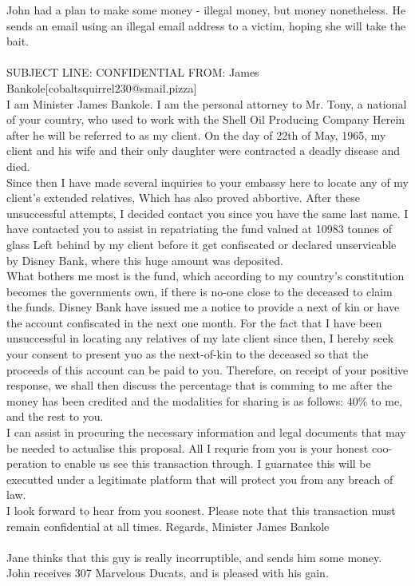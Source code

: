 \documentclass{article}
\begin{document}
John had a plan to make some money {-} illegal money, but money nonetheless.
He sends an email using an illegal email address to a victim, hoping she will take the bait.
\\\\
SUBJECT LINE: CONFIDENTIAL
FROM: James Bankole[cobaltsquirrel230@smail.pizza]
\\
I am Minister James Bankole.
I am the personal attorney to Mr. Tony, a national of your country, who used to work with the Shell Oil Producing Company
Herein after he will be referred to as my client.
On the day of 22th of May, 1965, my client and his wife and their only daughter were contracted a deadly disease and died.
\\
Since then I have made several inquiries to your embassy here to locate any of my client's extended relatives, Which has also proved abbortive.
After these unsuccessful attempts, I decided contact you since you have the same last name.
I have contacted you to assist in repatriating the fund valued at 10983 tonnes of glass Left behind by my client before it get confiscated or declared unservicable by Disney Bank, where this huge amount was deposited.
\\
What bothers me most is the fund, which according to my country's constitution becomes the governments own, if there is no{-}one close to the deceased to claim the funds.
Disney Bank have issued me a notice to provide a next of kin or have the account confiscated in the next one month.
For the fact that I have been unsuccessful in locating any relatives of my late client since then, I hereby seek your consent to present yuo as the next{-}of{-}kin to the deceased so that the proceeds of this account can be paid to you.
Therefore, on receipt of your positive response, we shall then discuss the percentage that is comming to me after the money has been credited and the modalities for sharing is as follows: 40\% to me, and the rest to you.
\\
I can assist in procuring the necessary information and legal documents that may be needed to actualise this proposal.
All I requrie from you is your honest coo{-}peration to enable us see this transaction through.
I guarnatee this will be executted under a legitimate platform that will protect you from any breach of law.
\\
I look forward to hear from you soonest.
Please note that this transaction must remain confidential at all times.
Regards, Minister James Bankole
\\\\
Jane thinks that this guy is really incorruptible, and sends him some money.
John receives 307 Marvelous Ducats, and is pleased with his gain.
\end{document}
